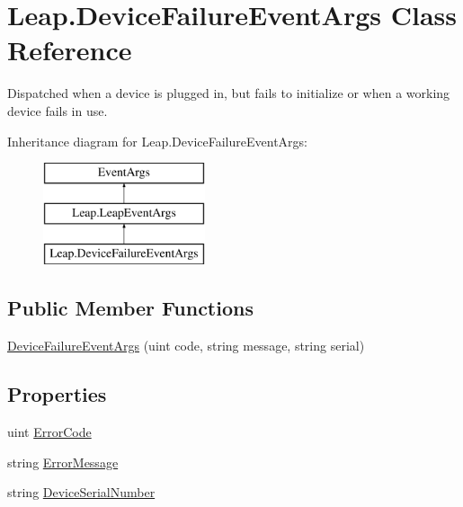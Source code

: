 \hypertarget{class_leap_1_1_device_failure_event_args}{}\section{Leap.\+Device\+Failure\+Event\+Args Class Reference}
\label{class_leap_1_1_device_failure_event_args}


Dispatched when a device is plugged in, but fails to initialize or when a working device fails in use.  


Inheritance diagram for Leap.\+Device\+Failure\+Event\+Args\+:\begin{figure}[H]
\begin{center}
\leavevmode
\includegraphics[height=3.000000cm]{class_leap_1_1_device_failure_event_args}
\end{center}
\end{figure}
\subsection*{Public Member Functions}
\begin{DoxyCompactItemize}
\item 
\mbox{\hyperlink{class_leap_1_1_device_failure_event_args_afd2dfa795d28777bdf9264d81e7bd9ec}{Device\+Failure\+Event\+Args}} (uint code, string message, string serial)
\end{DoxyCompactItemize}
\subsection*{Properties}
\begin{DoxyCompactItemize}
\item 
uint \mbox{\hyperlink{class_leap_1_1_device_failure_event_args_a1f1596fcef7f079254b86fc04e0d0822}{Error\+Code}}
\item 
string \mbox{\hyperlink{class_leap_1_1_device_failure_event_args_a71ceae770192fda22d991ccef959c15b}{Error\+Message}}
\item 
string \mbox{\hyperlink{class_leap_1_1_device_failure_event_args_a7fb44f91311e8344a9af9d33dd307d28}{Device\+Serial\+Number}}
\end{DoxyCompactItemize}


